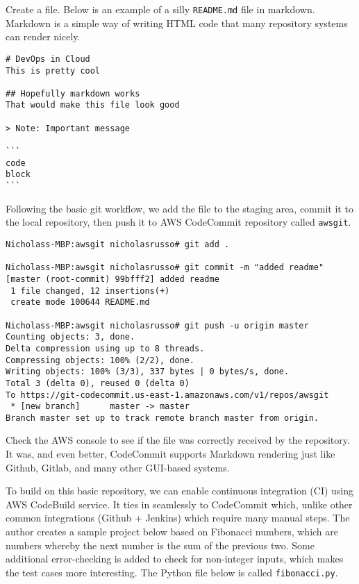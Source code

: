 Create a file. Below is an example of a silly \verb|README.md| file in markdown.
Markdown is a simple way of writing HTML code that many repository systems can
render nicely.

\begin{verbatim}
# DevOps in Cloud
This is pretty cool

## Hopefully markdown works
That would make this file look good

> Note: Important message

```
code
block
```
\end{verbatim}

Following the basic git workflow, we add the file to the staging area, commit
it to the local repository, then push it to AWS CodeCommit repository called
\verb|awsgit|.

\begin{verbatim}
Nicholass-MBP:awsgit nicholasrusso# git add .

Nicholass-MBP:awsgit nicholasrusso# git commit -m "added readme"
[master (root-commit) 99bfff2] added readme
 1 file changed, 12 insertions(+)
 create mode 100644 README.md

Nicholass-MBP:awsgit nicholasrusso# git push -u origin master
Counting objects: 3, done.
Delta compression using up to 8 threads.
Compressing objects: 100% (2/2), done.
Writing objects: 100% (3/3), 337 bytes | 0 bytes/s, done.
Total 3 (delta 0), reused 0 (delta 0)
To https://git-codecommit.us-east-1.amazonaws.com/v1/repos/awsgit
 * [new branch]      master -> master
Branch master set up to track remote branch master from origin.
\end{verbatim}

Check the AWS console to see if the file was correctly received by the
repository. It was, and even better, CodeCommit supports Markdown rendering
just like Github, Gitlab, and many other GUI-based systems.


To build on this basic repository, we can enable continuous integration (CI)
using AWS CodeBuild service. It ties in seamlessly to CodeCommit which, unlike
other common integrations (Github + Jenkins) which require many manual steps.
The author creates a sample project below based on Fibonacci numbers, which
are numbers whereby the next number is the sum of the previous two. Some
additional error-checking is added to check for non-integer inputs, which
makes the test cases more interesting. The Python file below is called
\verb|fibonacci.py|.

